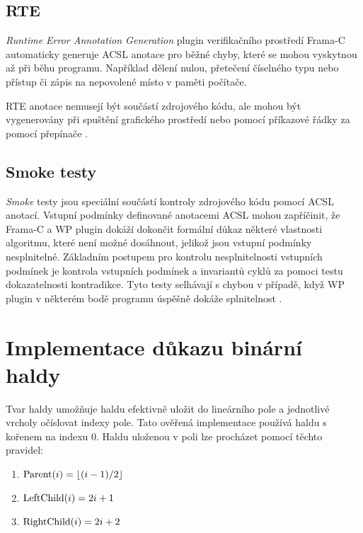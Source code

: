 \section{RTE}

\textit{Runtime Error Annotation Generation} plugin verifikačního prostředí Frama-C automaticky generuje ACSL anotace pro běžné chyby, které se mohou vyskytnou až při běhu programu. Například dělení nulou, přetečení číselného typu nebo přístup či zápis na nepovolené místo v paměti počítače. \cite{FramaC24RTEManual}

RTE anotace nemusejí být součástí zdrojového kódu, ale mohou být vygenerovány při spuštění grafického prostředí nebo pomocí příkazové řádky za pomocí přepínače .


\section{Smoke testy}

\textit{Smoke} testy jsou speciální součástí kontroly zdrojového kódu pomocí ACSL anotací. Vstupní podmínky definované anotacemi ACSL mohou zapříčinit, že Frama-C a WP plugin dokáží dokončit formální důkaz některé vlastnosti algoritmu, které není možné dosáhnout, jelikož jsou vstupní podmínky nesplnitelné. Základním postupem pro kontrolu nesplnitelnosti vstupních podmínek je kontrola vstupních podmínek a invariantů cyklů za pomoci testu dokazatelnosti kontradikce. Tyto testy selhávají s chybou v případě, když WP plugin v některém bodě programu úspěšně dokáže splnitelnost . \cite{FramaC24WPManual}


\chapter{Implementace důkazu binární haldy}

Tvar haldy umožňuje haldu efektivně uložit do lineárního pole a jednotlivé vrcholy očíslovat indexy pole. Tato ověřená implementace používá haldu s kořenem na indexu $0$. Haldu uloženou v poli lze procházet pomocí těchto pravidel:

\begin{enumerate}
	\item[] $\operatorname{Parent}(i) = \lfloor (i - 1) / 2 \rfloor$
	\item[] $\operatorname{LeftChild}(i) = 2i + 1$
	\item[] $\operatorname{RightChild}(i) = 2i + 2$
\end{enumerate}

